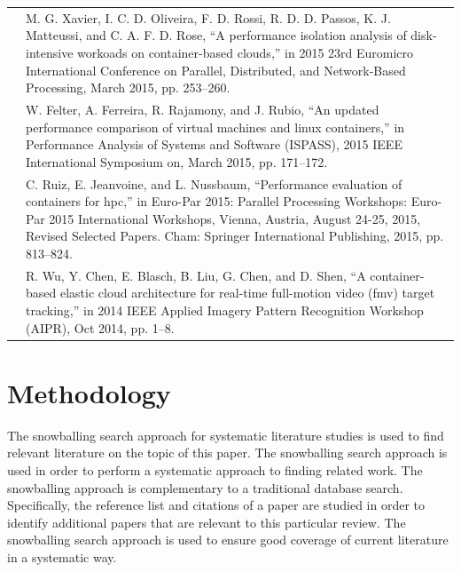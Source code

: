 \begin{table}[ht]
\begin{tabular}{| >{\centering}m{1.3cm} |>{\arraybackslash}m{12.7cm}|}
\cite{p5} & M. G. Xavier, I. C. D. Oliveira, F. D. Rossi, R. D. D. Passos, K. J. Matteussi, and C. A. F. D. Rose, “A performance isolation analysis of disk-intensive workoads on container-based clouds,” in 2015 23rd Euromicro International Conference on Parallel, Distributed, and Network-Based Processing, March 2015, pp. 253–260. \\
\cite{p6}  & W. Felter, A. Ferreira, R. Rajamony, and J. Rubio, “An updated performance comparison of virtual machines and linux containers,” in Performance Analysis of Systems and Software (ISPASS), 2015 IEEE International Symposium on, March 2015, pp. 171–172.                                                                            \\
\cite{p7} & C. Ruiz, E. Jeanvoine, and L. Nussbaum, “Performance evaluation of containers for hpc,” in Euro-Par 2015: Parallel Processing Workshops: Euro-Par 2015 International Workshops, Vienna, Austria, August 24-25, 2015, Revised Selected Papers. Cham: Springer International Publishing, 2015, pp. 813–824. \\
\cite{p8} & R. Wu, Y. Chen, E. Blasch, B. Liu, G. Chen, and D. Shen, “A container-based elastic cloud architecture for real-time full-motion video (fmv) target tracking,” in 2014 IEEE Applied Imagery Pattern Recognition Workshop (AIPR), Oct 2014, pp. 1–8. \\ \hline
\end{tabular}
\end{table}


\section{Methodology}
The snowballing search approach for systematic literature studies is used to find relevant literature on the topic of this paper. The snowballing search approach is used in order to perform a systematic approach to finding related work. The snowballing approach is complementary to a traditional database search. Specifically, the reference list and citations of a paper are studied in order to identify additional papers that are relevant to this particular review. The snowballing search approach is used to ensure good coverage of current literature in a systematic way.\\

